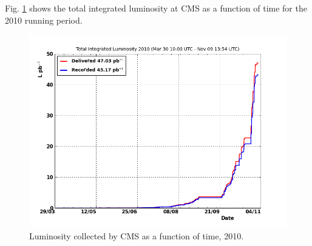 Fig. \ref{fig:LuminosityVsTime} shows the total integrated luminosity at CMS 
as a function of time for the 2010 running period.  

 \begin{figure}[htb]
  \begin{center}
    \includegraphics[width=360pt]{Figures/totallumivstime2010.png}
  \end{center}
  \caption[Luminosity collected by CMS as a function of time, 2010]{Luminosity collected by CMS as a function of time, 2010.}
  \label{fig:LuminosityVsTime}
 \end{figure}


